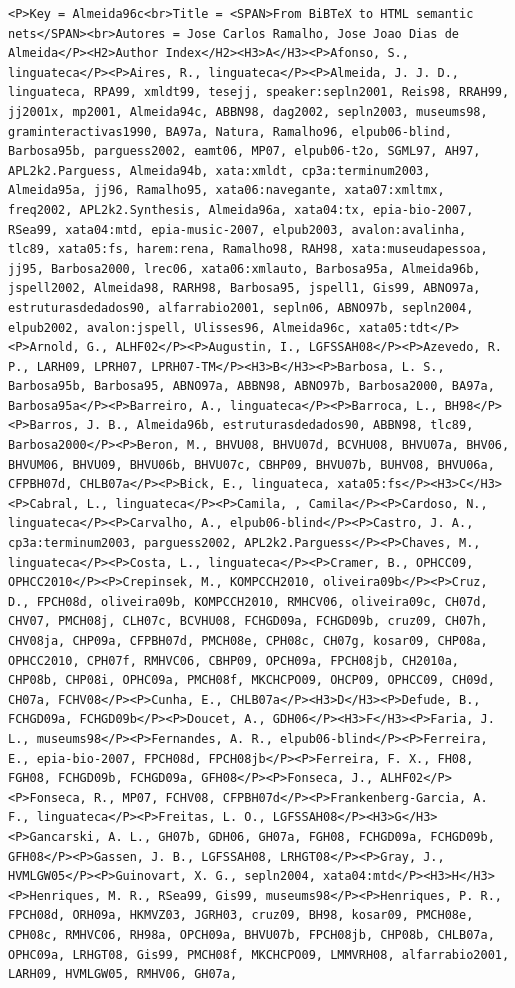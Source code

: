 \documentclass[11pt,a4paper]{report}
\begin{document}
\begin{appendices}
\begin{lstlisting}
<P>Key = Almeida96c<br>Title = <SPAN>From BiBTeX to HTML semantic nets</SPAN><br>Autores = Jose Carlos Ramalho, Jose Joao Dias de Almeida</P><H2>Author Index</H2><H3>A</H3><P>Afonso, S., linguateca</P><P>Aires, R., linguateca</P><P>Almeida, J. J. D., linguateca, RPA99, xmldt99, tesejj, speaker:sepln2001, Reis98, RRAH99, jj2001x, mp2001, Almeida94c, ABBN98, dag2002, sepln2003, museums98, graminteractivas1990, BA97a, Natura, Ramalho96, elpub06-blind, Barbosa95b, parguess2002, eamt06, MP07, elpub06-t2o, SGML97, AH97, APL2k2.Parguess, Almeida94b, xata:xmldt, cp3a:terminum2003, Almeida95a, jj96, Ramalho95, xata06:navegante, xata07:xmltmx, freq2002, APL2k2.Synthesis, Almeida96a, xata04:tx, epia-bio-2007, RSea99, xata04:mtd, epia-music-2007, elpub2003, avalon:avalinha, tlc89, xata05:fs, harem:rena, Ramalho98, RAH98, xata:museudapessoa, jj95, Barbosa2000, lrec06, xata06:xmlauto, Barbosa95a, Almeida96b, jspell2002, Almeida98, RARH98, Barbosa95, jspell1, Gis99, ABNO97a, estruturasdedados90, alfarrabio2001, sepln06, ABNO97b, sepln2004, elpub2002, avalon:jspell, Ulisses96, Almeida96c, xata05:tdt</P><P>Arnold, G., ALHF02</P><P>Augustin, I., LGFSSAH08</P><P>Azevedo, R. P., LARH09, LPRH07, LPRH07-TM</P><H3>B</H3><P>Barbosa, L. S., Barbosa95b, Barbosa95, ABNO97a, ABBN98, ABNO97b, Barbosa2000, BA97a, Barbosa95a</P><P>Barreiro, A., linguateca</P><P>Barroca, L., BH98</P><P>Barros, J. B., Almeida96b, estruturasdedados90, ABBN98, tlc89, Barbosa2000</P><P>Beron, M., BHVU08, BHVU07d, BCVHU08, BHVU07a, BHV06, BHVUM06, BHVU09, BHVU06b, BHVU07c, CBHP09, BHVU07b, BUHV08, BHVU06a, CFPBH07d, CHLB07a</P><P>Bick, E., linguateca, xata05:fs</P><H3>C</H3><P>Cabral, L., linguateca</P><P>Camila, , Camila</P><P>Cardoso, N., linguateca</P><P>Carvalho, A., elpub06-blind</P><P>Castro, J. A., cp3a:terminum2003, parguess2002, APL2k2.Parguess</P><P>Chaves, M., linguateca</P><P>Costa, L., linguateca</P><P>Cramer, B., OPHCC09, OPHCC2010</P><P>Crepinsek, M., KOMPCCH2010, oliveira09b</P><P>Cruz, D., FPCH08d, oliveira09b, KOMPCCH2010, RMHCV06, oliveira09c, CH07d, CHV07, PMCH08j, CLH07c, BCVHU08, FCHGD09a, FCHGD09b, cruz09, CH07h, CHV08ja, CHP09a, CFPBH07d, PMCH08e, CPH08c, CH07g, kosar09, CHP08a, OPHCC2010, CPH07f, RMHVC06, CBHP09, OPCH09a, FPCH08jb, CH2010a, CHP08b, CHP08i, OPHC09a, PMCH08f, MKCHCPO09, OHCP09, OPHCC09, CH09d, CH07a, FCHV08</P><P>Cunha, E., CHLB07a</P><H3>D</H3><P>Defude, B., FCHGD09a, FCHGD09b</P><P>Doucet, A., GDH06</P><H3>F</H3><P>Faria, J. L., museums98</P><P>Fernandes, A. R., elpub06-blind</P><P>Ferreira, E., epia-bio-2007, FPCH08d, FPCH08jb</P><P>Ferreira, F. X., FH08, FGH08, FCHGD09b, FCHGD09a, GFH08</P><P>Fonseca, J., ALHF02</P><P>Fonseca, R., MP07, FCHV08, CFPBH07d</P><P>Frankenberg-Garcia, A. F., linguateca</P><P>Freitas, L. O., LGFSSAH08</P><H3>G</H3><P>Gancarski, A. L., GH07b, GDH06, GH07a, FGH08, FCHGD09a, FCHGD09b, GFH08</P><P>Gassen, J. B., LGFSSAH08, LRHGT08</P><P>Gray, J., HVMLGW05</P><P>Guinovart, X. G., sepln2004, xata04:mtd</P><H3>H</H3><P>Henriques, M. R., RSea99, Gis99, museums98</P><P>Henriques, P. R., FPCH08d, ORH09a, HKMVZ03, JGRH03, cruz09, BH98, kosar09, PMCH08e, CPH08c, RMHVC06, RH98a, OPCH09a, BHVU07b, FPCH08jb, CHP08b, CHLB07a, OPHC09a, LRHGT08, Gis99, PMCH08f, MKCHCPO09, LMMVRH08, alfarrabio2001, LARH09, HVMLGW05, RMHV06, GH07a, 
\end{lstlisting}
\end{appendices}
\end{document}
